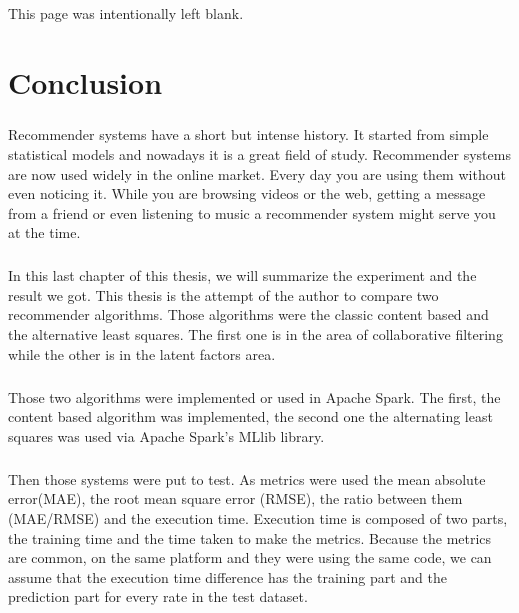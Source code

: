 \newpage
\begin{center}
	This page was intentionally left blank.
\end{center}
\newpage
\chapter{Conclusion}
\paragraph{}Recommender systems have a short but intense history. It started from simple statistical models and nowadays it is a great field of study. Recommender systems are now used widely in the online market. Every day you are using them without even noticing it. While you are browsing videos or the web, getting a message from a friend or even listening to music a recommender system might serve you at the time.

\paragraph{} In this last chapter of this thesis, we will summarize the experiment and the result we got. This thesis is the attempt of the author to compare two recommender algorithms. Those algorithms were the classic content based and the alternative least squares. The first one is in the area of collaborative filtering while the other is in the latent factors area.

\paragraph{} Those two algorithms were implemented or used in Apache Spark. The first, the content based algorithm was implemented, the second one the alternating least squares was used via Apache Spark's MLlib library.

\paragraph{} Then those systems were put to test. As metrics were used the mean absolute error(MAE), the root mean square error (RMSE), the ratio between them (MAE/RMSE) and the execution time. Execution time is composed of two parts, the training time and the time taken to make the metrics. Because the metrics are common, on the same platform and they were using the same code, we can assume that the execution time difference has the training part and the prediction part for every rate in the test dataset.

